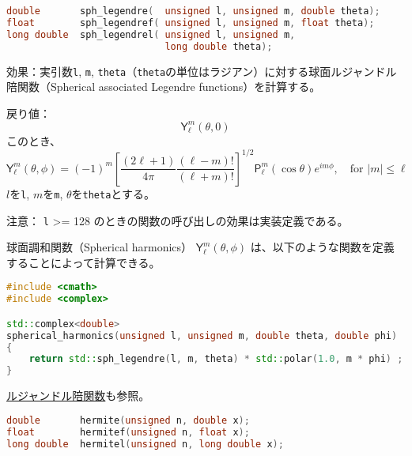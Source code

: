 \bgroup
\begin{lstlisting}[language=C++, aboveskip=0.0zw]
double       sph_legendre(  unsigned l, unsigned m, double theta);
float        sph_legendref( unsigned l, unsigned m, float theta);
long double  sph_legendrel( unsigned l, unsigned m,
                            long double theta);
\end{lstlisting}
\egroup

\noindent
\textsf{効果}：実引数\lstinline!l!, \lstinline!m!,
\lstinline!theta!（\lstinline!theta!の単位はラジアン）に対する球面ルジャンドル陪関数（Spherical
associated Legendre functions）を計算する。

\noindent
\textsf{戻り値}：
\[
  \mathsf{Y}_\ell^m(\theta, 0)
\]
\hspace*{3em}このとき、
\[
  \mathsf{Y}_\ell^m(\theta, \phi) =
  (-1)^m \left[ \frac{(2 \ell + 1)}
                     {4 \pi}
            \frac{(\ell - m)!}
                 {(\ell + m)!}
         \right]^{1/2}
     \mathsf{P}_\ell^m
     ( \cos\theta ) e ^ {i m \phi},
       \quad \mbox{for $|m| \le \ell$}
\]
\hspace*{3em}\(l\)を\lstinline!l!, \(m\)を\lstinline!m!,
\(\theta\)を\lstinline!theta!とする。

\noindent
\textsf{注意}： \lstinline!l! \textgreater{}= 128
のときの関数の呼び出しの効果は実装定義である。

球面調和関数（Spherical harmonics） \(\mathsf{Y}_\ell^m(\theta, \phi)\)
は、以下のような関数を定義することによって計算できる。

\begin{lstlisting}[language=C++]
#include <cmath>
#include <complex>

std::complex<double>
spherical_harmonics(unsigned l, unsigned m, double theta, double phi)
{
    return std::sph_legendre(l, m, theta) * std::polar(1.0, m * phi) ;
}
\end{lstlisting}

\noindent
\hyperref[section8-4]{ルジャンドル陪関数}も参照。

%

\bgroup
\begin{lstlisting}[language=C++, aboveskip=0.0zw]
double       hermite(unsigned n, double x);
float        hermitef(unsigned n, float x);
long double  hermitel(unsigned n, long double x);
\end{lstlisting}
\egroup

